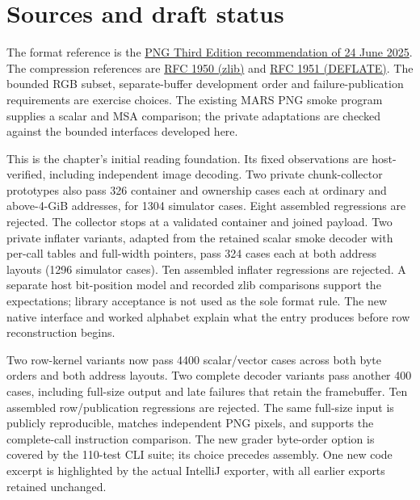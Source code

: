 \section{Sources and draft status}
The format reference is the
\href{https://www.w3.org/TR/2025/REC-png-3-20250624/}{PNG Third Edition recommendation
  of 24 June 2025}. The compression references are
\href{https://www.rfc-editor.org/rfc/rfc1950.html}{RFC 1950 (zlib)} and
\href{https://www.rfc-editor.org/rfc/rfc1951.html}{RFC 1951 (DEFLATE)}.
The bounded RGB subset, separate-buffer development order and failure-publication
requirements are exercise choices. The existing MARS PNG smoke program supplies a
scalar and MSA comparison; the private adaptations are checked against the bounded
interfaces developed here.

This is the chapter's initial reading foundation. Its fixed observations are
host-verified, including independent image decoding. Two private chunk-collector
prototypes also pass 326 container and ownership cases each at ordinary and above-4-GiB
addresses, for 1304 simulator cases. Eight assembled regressions are rejected. The
collector stops at a validated container and joined payload. Two private inflater
variants, adapted from the retained scalar smoke decoder with per-call tables and
full-width pointers, pass 324 cases each at both address layouts (1296 simulator
cases). Ten assembled inflater regressions are rejected. A separate host bit-position
model and recorded zlib comparisons support the expectations; library acceptance is
not used as the sole format rule. The new native interface and worked alphabet explain
what the entry produces before row reconstruction begins.

Two row-kernel variants now pass 4400 scalar/vector cases across both byte orders
and both address layouts. Two complete decoder variants pass another 400 cases,
including full-size output and late failures that retain the framebuffer. Ten
assembled row/publication regressions are rejected. The same full-size input is
publicly reproducible, matches independent PNG pixels, and supports the complete-call
instruction comparison. The new grader byte-order option is covered by the 110-test
CLI suite; its choice precedes assembly. One new code excerpt is highlighted by the
actual IntelliJ exporter, with all earlier exports retained unchanged.

